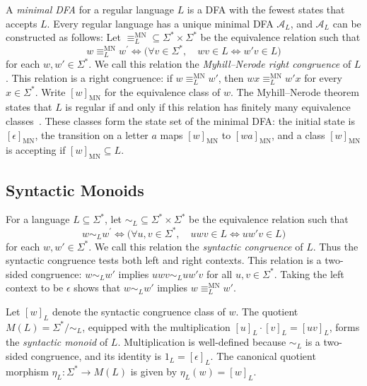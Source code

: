 \documentclass{ieice-tecrep}
\begin{document}
A \emph{minimal DFA} for a regular language \(L\) is a DFA with the fewest states that accepts \(L\).
Every regular language has a unique minimal DFA \(\mathcal{A}_L\), and \(\mathcal{A}_L\) can be constructed as follows:
Let \(\equiv_L^{\mathrm{MN}} \subseteq \Sigma^* \times \Sigma^*\) be the equivalence relation such that
\[
w\equiv_L^{\mathrm{MN}}w^{\prime}
\Longleftrightarrow
\bigl(\forall v\in\Sigma^*,\quad wv\in L\Longleftrightarrow w'v\in L\bigr)
\] for each \(w,w'\in\Sigma^*\).
We call this relation the \emph{Myhill--Nerode right congruence} of \(L\).
This relation is a right congruence: if
\(w\equiv_L^{\mathrm{MN}}w'\), then
\(wx\equiv_L^{\mathrm{MN}}w'x\) for every \(x\in\Sigma^*\).
Write \([w]_{\mathrm{MN}}\) for the equivalence class of \(w\).
The Myhill--Nerode theorem states that \(L\) is regular if and only if
this relation has finitely many equivalence classes~\cite{myhill1957finite,nerode1958linear}. These classes
form the state set of the minimal DFA: the initial state is
\([\epsilon]_{\mathrm{MN}}\), the transition on a letter \(a\) maps
\([w]_{\mathrm{MN}}\) to \([wa]_{\mathrm{MN}}\), and a class \([w]_{\mathrm{MN}}\) is
accepting if \([w]_{\mathrm{MN}}\subseteq L\).

\subsection{Syntactic Monoids}\label{syntactic-monoid}

For a language \(L\subseteq\Sigma^*\), let \(\sim_L \subseteq \Sigma^* \times \Sigma^*\) be the equivalence relation such that
\[
w\sim_L w^{\prime}
\Longleftrightarrow
\bigl(\forall u,v\in\Sigma^*,\quad uwv\in L\Longleftrightarrow uw'v\in L\bigr)
\] for each \(w,w'\in\Sigma^*\).
We call this relation the \emph{syntactic congruence} of \(L\).
Thus the syntactic congruence tests both left and right contexts.
This relation is a two-sided congruence: \(w\sim_L w'\) implies
\(uwv\sim_L uw'v\) for all \(u,v\in\Sigma^*\).
Taking the left context to be \(\epsilon\) shows that
\(w\sim_L w'\) implies \(w\equiv_L^{\mathrm{MN}}w'\).

Let \([w]_L\) denote the syntactic congruence class of \(w\).
The quotient \(M(L)=\Sigma^*/{\sim_L}\), equipped with the
multiplication \([u]_L\cdot[v]_L=[uv]_L\), forms the \emph{syntactic monoid}
of \(L\). Multiplication is well-defined because \(\sim_L\) is a
two-sided congruence, and its identity is
\(1_L=[\epsilon]_L\). The canonical quotient morphism
\(\eta_L:\Sigma^*\to M(L)\) is given by \(\eta_L(w)=[w]_L\).
\end{document}
